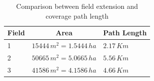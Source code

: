 \begin{table}[ht]
\centering
\begin{tabular}{|l|l|l|}
\hline
\multicolumn{1}{|c|}{\textbf{Field}} & \multicolumn{1}{c|}{\textbf{Area}} & \multicolumn{1}{c|}{\textbf{Path Length}} \\ \hline
1                                    & $15444\, m^2=1.5444\, ha$          & $2.17\, Km$                               \\ \hline
2                                    & $50665\, m^2=5.0665\, ha$          & $5.56\, Km$                               \\ \hline
3                                    & $41586\, m^2=4.1586\, ha$          & $4.66\, Km$                               \\ \hline
\end{tabular}
 \caption{Comparison between field extension and coverage path length}
 \label{tbl:fields-area-length}
\end{table}
